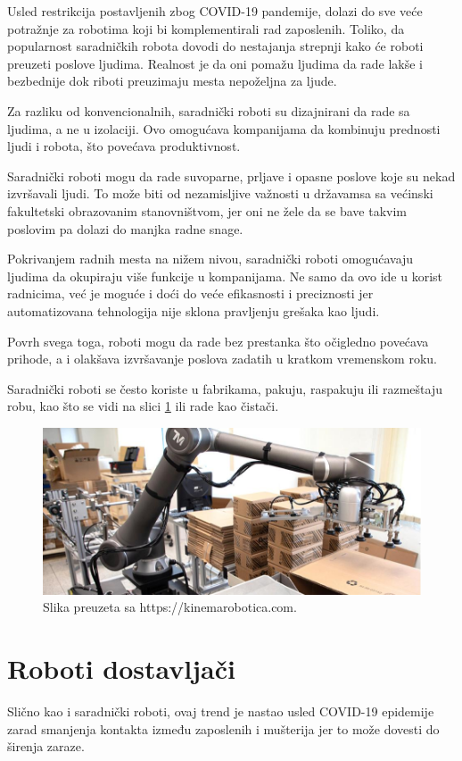 \documentclass{report}
\begin{document}
	Usled restrikcija postavljenih zbog COVID-19 pandemije, dolazi do sve veće potražnje za robotima koji bi komplementirali rad zaposlenih. Toliko, da popularnost saradničkih robota dovodi do nestajanja strepnji kako će roboti preuzeti poslove ljudima. Realnost je da oni pomažu ljudima da rade lakše i bezbednije dok riboti preuzimaju mesta nepoželjna za ljude.
	
	Za razliku od konvencionalnih, saradnički roboti su dizajnirani da rade sa ljudima, a ne u izolaciji. Ovo omogućava kompanijama da kombinuju prednosti ljudi i robota, što povećava produktivnost. \cite{robotics2022}
	
	Saradnički roboti mogu da rade suvoparne, prljave i opasne poslove koje su nekad izvršavali ljudi. To može biti od nezamisljive važnosti u državamsa sa većinski fakultetski obrazovanim stanovništvom, jer oni ne žele da se bave takvim poslovim pa dolazi do manjka radne snage.
	
	Pokrivanjem radnih mesta na nižem nivou, saradnički roboti omogućavaju ljudima da okupiraju više funkcije u kompanijama. Ne samo da ovo ide u korist radnicima, već je moguće i doći do veće efikasnosti i preciznosti jer automatizovana tehnologija nije sklona pravljenju grešaka kao ljudi.
	
	Povrh svega toga, roboti mogu da rade bez prestanka što očigledno povećava prihode, a i olakšava izvršavanje poslova zadatih u kratkom vremenskom roku. \cite{cobots}
	
	Saradnički roboti se često koriste u fabrikama, pakuju, raspakuju ili razmeštaju robu, kao što se vidi na slici \ref{cobot} ili rade kao čistači. \cite{robots2022}
	
	\begin{figure}
		\centering
		\includegraphics[scale=0.41]{Cobot.jpg}
		\caption{Slika preuzeta sa https://kinemarobotica.com.}
		\label{cobot}
	\end{figure}
	
	\chapter{Roboti dostavljači}
	Slično kao i saradnički roboti, ovaj trend je nastao usled COVID-19 epidemije zarad smanjenja kontakta između zaposlenih i mušterija jer to može dovesti do širenja zaraze.
	
\end{document}

